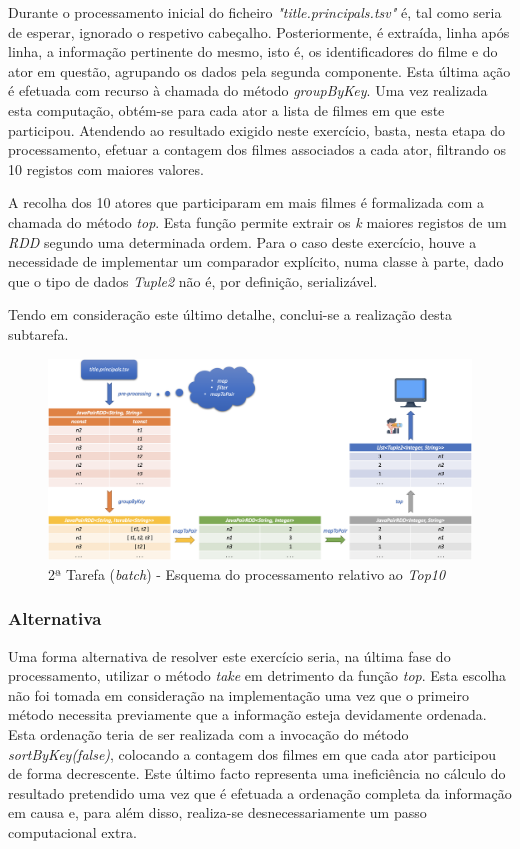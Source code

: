 \documentclass[a4paper]{report}
\begin{document}
{		Durante o processamento inicial do ficheiro \textsl{"title.principals.tsv"} é, tal como seria de esperar, ignorado o respetivo cabeçalho.
		Posteriormente, é extraída, linha após linha, a informação pertinente do mesmo, isto é, os identificadores do filme e do ator em questão, agrupando os dados pela segunda componente. Esta última ação é efetuada com recurso à chamada do método \textit{groupByKey}.
		Uma vez realizada esta computação, obtém-se para cada ator a lista de filmes em que este participou. Atendendo ao resultado exigido neste exercício, basta, nesta etapa do processamento, efetuar a contagem dos filmes associados a cada ator, filtrando os 10 registos com maiores valores.

		A recolha dos 10 atores que participaram em mais filmes é formalizada com a chamada do método \textit{top}. Esta função permite extrair os \textit{k} maiores registos de um \textit{RDD} segundo uma determinada ordem.
		Para o caso deste exercício, houve a necessidade de implementar um comparador explícito, numa classe à parte, dado que o tipo de dados \textit{Tuple2} não é, por definição, serializável.

		Tendo em consideração este último detalhe, conclui-se a realização desta subtarefa.

		\begin{figure}[H]
            \centering
            \includegraphics[width=1.0\textwidth]{Imagens/2ª Tarefa - Top10.png}
            \caption{2ª Tarefa (\textit{batch}) - Esquema do processamento relativo ao \textit{Top10}}
            \label{fig:5}
        \end{figure}

		\subsubsection{Alternativa} \label{sssec:Task2-Top10-Alternativa}
			Uma forma alternativa de resolver este exercício seria, na última fase do processamento, utilizar o método \textit{take} em detrimento da função \textit{top}.
			Esta escolha não foi tomada em consideração na implementação uma vez que o primeiro método necessita previamente que a informação esteja devidamente ordenada.
			Esta ordenação teria de ser realizada com a invocação do método \textit{sortByKey(false)}, colocando a contagem dos filmes em que cada ator participou de forma decrescente.
			Este último facto representa uma ineficiência no cálculo do resultado pretendido uma vez que é efetuada a ordenação completa da informação em causa e, para além disso, realiza-se desnecessariamente um passo computacional extra.

}
\end{document}
